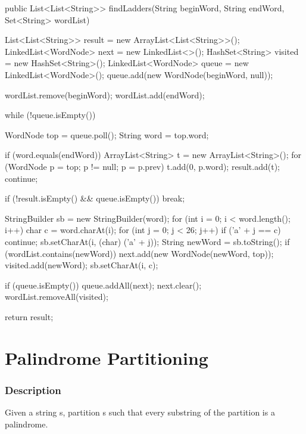 \begin{Code}
public List<List<String>> findLadders(String beginWord, String endWord, Set<String> wordList) {
    List<List<String>> result = new ArrayList<List<String>>();
    LinkedList<WordNode> next = new LinkedList<>();
    HashSet<String> visited = new HashSet<String>();
    LinkedList<WordNode> queue = new LinkedList<WordNode>();
    queue.add(new WordNode(beginWord, null));

    wordList.remove(beginWord);
    wordList.add(endWord);

    while (!queue.isEmpty()) {
        WordNode top = queue.poll();
        String word = top.word;

        if (word.equals(endWord)) {
            ArrayList<String> t = new ArrayList<String>();
            for (WordNode p = top; p != null; p = p.prev) {
                t.add(0, p.word);
            }
            result.add(t);
            continue;
        }

        if (!result.isEmpty() && queue.isEmpty()) {
            break;
        }

        StringBuilder sb = new StringBuilder(word);
        for (int i = 0; i < word.length(); i++) {
            char c = word.charAt(i);
            for (int j = 0; j < 26; j++) {
                if ('a' + j == c) {
                    continue;
                }
                sb.setCharAt(i, (char) ('a' + j));
                String newWord = sb.toString();
                if (wordList.contains(newWord)) {
                    next.add(new WordNode(newWord, top));
                    visited.add(newWord);
                }
            }
            sb.setCharAt(i, c);
        }

        if (queue.isEmpty()) {
            queue.addAll(next);
            next.clear();
            wordList.removeAll(visited);
        }
    }

    return result;
}
\end{Code}

\newpage

\section{Palindrome Partitioning} %

\subsubsection{Description}

Given a string s, partition s such that every substring of the partition is a palindrome.

